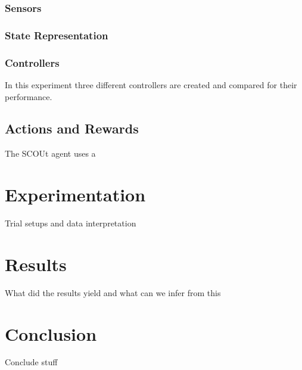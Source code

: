 \documentclass[]{report}
\begin{document}
\subsection{Sensors}

\subsection{State Representation}

\subsection{Controllers}
In this experiment three different controllers are created and compared for their performance.


\section{Actions and Rewards}
The SCOUt agent uses a



\chapter{Experimentation}
Trial setups and data interpretation



\chapter{Results}
What did the results yield and what can we infer from this



\chapter{Conclusion}
Conclude stuff




\end{document}
